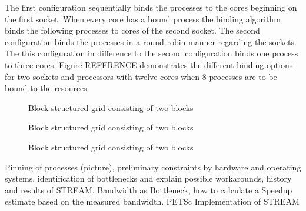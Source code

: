 The first configuration sequentially binds the processes to the cores beginning on the first socket. When every core has a bound process the binding algorithm binds the following processes to cores of the second socket. The second configuration binds the processes in a round robin manner regarding the sockets. The this configuration in difference to the second configuration binds one process to three cores. Figure REFERENCE demonstrates the different binding options for two sockets and processors with twelve cores when 8 processes are to be bound to the resources.

    \begin{figure}[h]
      \centering
      \label{fig:blockstruc}
        
        \centering{}
      \caption{Block structured grid consisting of two blocks}
     \end{figure}

    \begin{figure}[h]
      \centering
      \label{fig:blockstruc}
        
        \centering{}
      \caption{Block structured grid consisting of two blocks}
     \end{figure}

    \begin{figure}[h]
      \centering
      \label{fig:blockstruc}
        
        \centering{}
      \caption{Block structured grid consisting of two blocks}
     \end{figure}


        Pinning of processes (picture), preliminary constraints by hardware and operating systems, identification of bottlenecks and explain possible workarounds, history and results of STREAM. Bandwidth as Bottleneck, how to calculate a Speedup estimate based on the measured bandwidth. PETSc Implementation of STREAM

